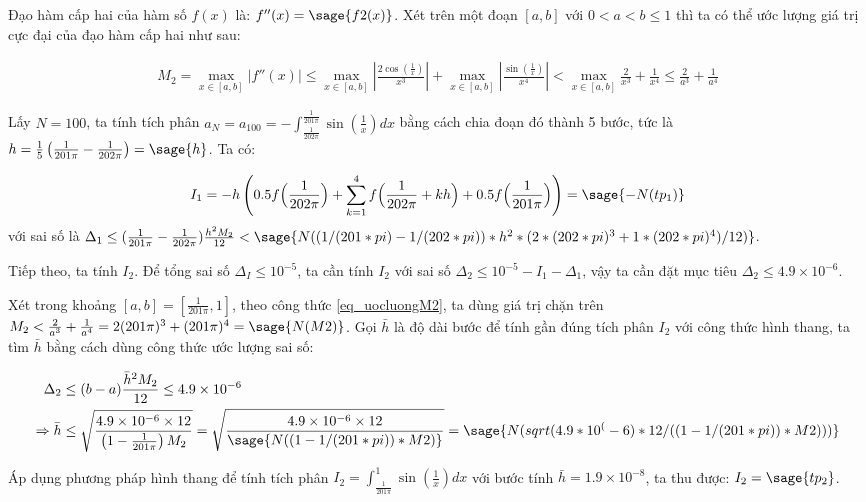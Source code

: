 \documentclass[12pt]{article}
\begin{document}
Đạo hàm cấp hai của hàm số $f(x)$ là: $f''(x)=\sage{f2(x)}$. Xét trên một đoạn $[a,b]$ với $0<a<b\leq 1$ thì ta có thể ước lượng giá trị cực đại của đạo hàm cấp hai như sau:

\begin{align}\label{eq_uocluongM2}
 M_2 = \max_{x \in [a,b]} |f''(x)| \leq \max_{x \in [a,b]} \left|\frac{2\cos\left(\frac{1}{x}\right)}{x^3}\right| + \max_{x \in [a,b]} \left|\frac{\sin\left(\frac{1}{x}\right)}{x^4}\right| < \max_{x \in [a,b]} \frac{2}{x^3}+\frac{1}{x^4} \leq \frac{2}{a^3}+\frac{1}{a^4}
\end{align}

Lấy $N=100$, ta tính tích phân $a_{N}=a_{100}=-\int_{\frac{1}{202\pi}}^{\frac{1}{201\pi}} \sin \left( \frac{1}{x} \right) dx$ bằng cách chia đoạn đó thành 5 bước, tức là $h=\frac{1}{5} \left(\frac{1}{201\pi}-\frac{1}{202\pi}\right)=\sage{h}$. Ta có:

\begin{align*}
I_1 = -h \left( 0.5f\Big(\frac{1}{202\pi}\Big)+\sum_{k=1}^4 f\Big(\frac{1}{202\pi}+kh\Big)+0.5f\Big(\frac{1}{201\pi}\Big) \right) = \sage{-N(tp_1)}
\end{align*}
với sai số là $\Delta_1 \leq (\frac{1}{201\pi}-\frac{1}{202\pi}) \frac{h^2 M_2}{12} < 
\sage{N((1/(201*pi)-1/(202*pi))*h^2*(2*(202*pi)^3+1*(202*pi)^4)/12)}$.

Tiếp theo, ta tính $I_2$. Để tổng sai số $\Delta_I\leq 10^{-5}$, ta cần tính $I_2$ với sai số $\Delta_2 \leq 10^{-5} - I_1 - \Delta_1$, vậy ta cần đặt mục tiêu $\Delta_2 \leq 4.9 \times 10^{-6}$.

Xét trong khoảng $[a,b]=\left[ \frac{1}{201\pi}, 1 \right]$, theo công thức \eqref{eq_uocluongM2}, ta dùng giá trị chặn trên $M_2 < \frac{2}{a^3}+\frac{1}{a^4} = 2(201\pi)^3+(201\pi)^4 = \sage{N(M2)}$. Gọi $\bar{h}$ là độ dài bước để tính gần đúng tích phân $I_2$ với công thức hình thang, ta tìm $\bar{h}$ bằng cách dùng công thức ước lượng sai số:

\begin{align*}
 \Delta_2 &\leq (b-a)\frac{\bar{h}^2 M_2}{12} \leq 4.9 \times 10^{-6}\\
 \Rightarrow \bar{h} &\leq \sqrt{\frac{4.9 \times 10^{-6}\times 12}{\left(1-\frac{1}{201\pi} \right)M_2}} = \sqrt{\frac{4.9 \times 10^{-6}\times 12}{\sage{N((1-1/(201*pi))*M2)}}} = \sage{N(sqrt(4.9*10^(-6)*12/((1-1/(201*pi))*M2)))}
\end{align*}

Áp dụng phương pháp hình thang để tính tích phân $I_2 = \int_{\frac{1}{201\pi}}^1 \sin \left( \frac{1}{x} \right) dx$ với bước tính $\bar{h}=1.9 \times 10^{-8}$, ta thu được: $I_2 = \sage{tp_2}$.
\end{document}

